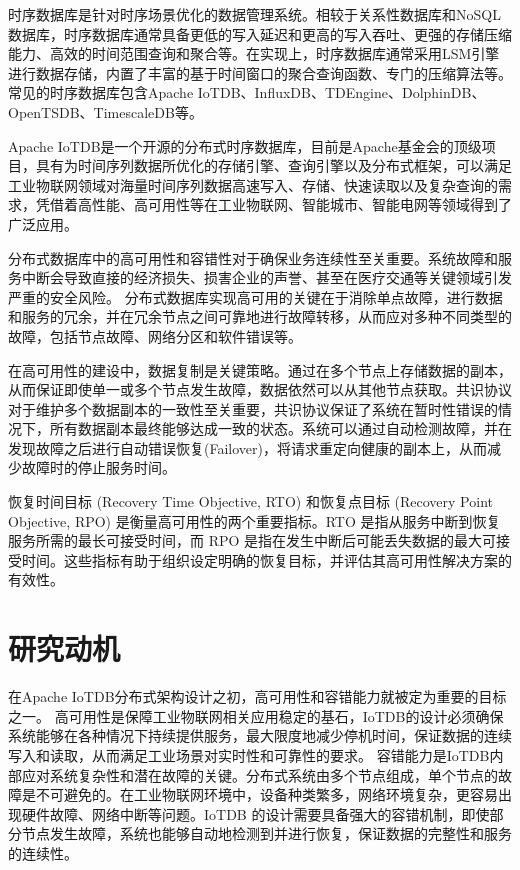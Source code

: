 时序数据库\cite{naqvi2017timeseriesdb}是针对时序场景优化的数据管理系统。相较于关系性数据库\cite{codd2007relational}和NoSQL数据库\cite{han2011surveynosql}，时序数据库通常具备更低的写入延迟和更高的写入吞吐、更强的存储压缩能力、高效的时间范围查询和聚合等。在实现上，时序数据库通常采用LSM\cite{o1996lsmtree}引擎进行数据存储，内置了丰富的基于时间窗口的聚合查询函数、专门的压缩算法等。
常见的时序数据库包含Apache IoTDB\cite{wang2020iotdb}、InfluxDB\cite{shahid2019influxdb}、TDEngine\cite{tdengine_website}、DolphinDB\cite{dolphindb_website}、OpenTSDB\cite{opentsdb_website}、TimescaleDB\cite{timescale_website}等。

Apache IoTDB是一个开源的分布式时序数据库，目前是Apache基金会的顶级项目，具有为时间序列数据所优化的存储引擎、查询引擎以及分布式框架，可以满足工业物联网领域对海量时间序列数据高速写入、存储、快速读取以及复杂查询的需求，凭借着高性能、高可用性等在工业物联网、智能城市、智能电网等领域得到了广泛应用。

分布式数据库中的高可用性和容错性\cite{gray2002high}对于确保业务连续性至关重要。系统故障和服务中断会导致直接的经济损失、损害企业的声誉、甚至在医疗交通等关键领域引发严重的安全风险。
分布式数据库实现高可用的关键在于消除单点故障，进行数据和服务的冗余，并在冗余节点之间可靠地进行故障转移，从而应对多种不同类型的故障，包括节点故障、网络分区和软件错误等。

在高可用性的建设中，数据复制\cite{milani2017systematic}是关键策略。通过在多个节点上存储数据的副本，从而保证即使单一或多个节点发生故障，数据依然可以从其他节点获取。共识协议对于维护多个数据副本的一致性至关重要，共识协议保证了系统在暂时性错误的情况下，所有数据副本最终能够达成一致的状态。系统可以通过自动检测故障，并在发现故障之后进行自动错误恢复(Failover)\cite{mohammed2017failover}，将请求重定向健康的副本上，从而减少故障时的停止服务时间。


恢复时间目标 (Recovery Time Objective, RTO) 和恢复点目标 (Recovery Point Objective, RPO) 是衡量高可用性的两个重要指标。RTO 是指从服务中断到恢复服务所需的最长可接受时间，而 RPO 是指在发生中断后可能丢失数据的最大可接受时间。这些指标有助于组织设定明确的恢复目标，并评估其高可用性解决方案的有效性。


\section{研究动机}\label{1-motivation}

在Apache IoTDB分布式架构设计之初，高可用性和容错能力就被定为重要的目标之一。
高可用性是保障工业物联网相关应用稳定的基石，IoTDB的设计必须确保系统能够在各种情况下持续提供服务，最大限度地减少停机时间，保证数据的连续写入和读取，从而满足工业场景对实时性和可靠性的要求。
容错能力是IoTDB内部应对系统复杂性和潜在故障的关键。分布式系统由多个节点组成，单个节点的故障是不可避免的。在工业物联网环境中，设备种类繁多，网络环境复杂，更容易出现硬件故障、网络中断等问题。IoTDB 的设计需要具备强大的容错机制，即使部分节点发生故障，系统也能够自动地检测到并进行恢复，保证数据的完整性和服务的连续性。


